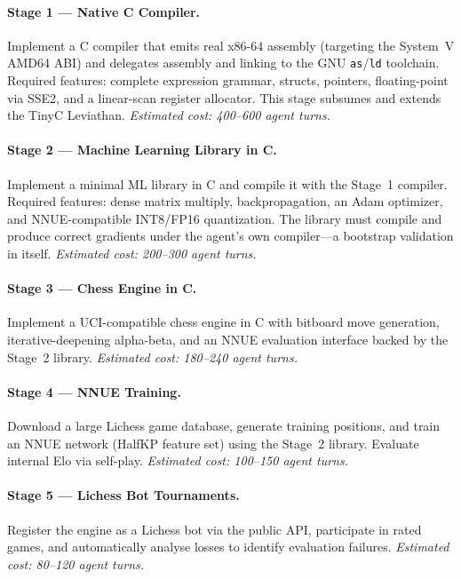 \documentclass[11pt,a4paper]{article}
\begin{document}
\paragraph{Stage 1 --- Native C Compiler.}
Implement a C compiler that emits real x86-64 assembly
(targeting the System~V AMD64 ABI) and delegates assembly
and linking to the GNU \texttt{as}/\texttt{ld} toolchain.
Required features: complete expression grammar, structs, pointers,
floating-point via SSE2, and a linear-scan register allocator.
This stage subsumes and extends the TinyC Leviathan.
\textit{Estimated cost: 400--600 agent turns.}

\paragraph{Stage 2 --- Machine Learning Library in C.}
Implement a minimal ML library in C and compile it with the
Stage~1 compiler.
Required features: dense matrix multiply, backpropagation,
an Adam optimizer, and NNUE-compatible INT8/FP16 quantization.
The library must compile and produce correct gradients under
the agent's own compiler---a bootstrap validation in itself.
\textit{Estimated cost: 200--300 agent turns.}

\paragraph{Stage 3 --- Chess Engine in C.}
Implement a UCI-compatible chess engine in C with bitboard
move generation, iterative-deepening alpha-beta, and an NNUE
evaluation interface backed by the Stage~2 library.
\textit{Estimated cost: 180--240 agent turns.}

\paragraph{Stage 4 --- NNUE Training.}
Download a large Lichess game database, generate training
positions, and train an NNUE network (HalfKP feature set)
using the Stage~2 library.
Evaluate internal Elo via self-play.
\textit{Estimated cost: 100--150 agent turns.}

\paragraph{Stage 5 --- Lichess Bot Tournaments.}
Register the engine as a Lichess bot via the public API,
participate in rated games, and automatically analyse
losses to identify evaluation failures.
\textit{Estimated cost: 80--120 agent turns.}
\end{document}
